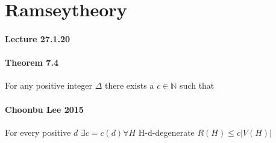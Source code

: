 \section{Ramseytheory}
\paragraph{Lecture 27.1.20}

\paragraph{Theorem 7.4} 
For any positive integer $ \Delta $ there exists a 
$ c \in \mathbb{N} $ such that 

\paragraph{Choonbu Lee 2015}
For every positive $ d $ $ \exists c = c(d) \forall H $
H-d-degenerate $ R(H) \leq c|V(H)| $